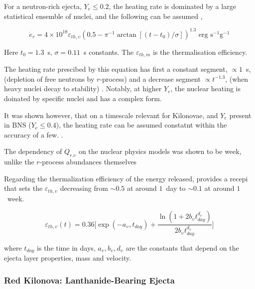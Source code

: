 \documentclass[11pt,a4paper,headinclude=true,DIV=14,BCOR=8mm,chapterprefix,listof=totoc,twoside,openright,abstracton]{scrbook}
\begin{document}
For a neutron-rich ejecta, $Y_e\leq0.2$, the heating rate is dominated by a large statistical ensemble of nuclei, and the following can be assumed \cite{Korobkin et al 2012},

\begin{equation}
    \dot{e}_r = 4\times 10^{18} \varepsilon_{th,\upsilon}(0.5 - \pi^{-1} \arctan[(t-t_0)/\sigma])^{1.3} \text{ erg } \text{s}^{-1} \text{g}^{-1}
\end{equation}

Here $t_0=1.3$~s, $\sigma=0.11$~s constants. The $\varepsilon_{th,m}$ is the thermalisation efficiency.

The heating rate prescibed by this equation has first a constant segment, $\propto1$~s, (depletion of free neutrons by $r$-process) and a decrease segment $\propto t^{-1.3}$, (when heavy nuclei decay to stability) \cite{(Metzger et al 2010b; Roberts et al 2011)}. 
Notably, at higher $Y_e$, the nuclear heating is doinated by specific nuclei and has a complex form.

It was shown however, that on a timescale relevant for Kilonovae, and $Y_e$ present in BNS ($Y_e\leq0.4$), the heating rate can be assumed constatnt within the accuracy of a few. \cite{(Lippuner and Roberts 2015, their Fig. 7)}.

The dependency of $\dot{Q}_{r.\upsilon}$ on the nuclear physics models was shown to be week, unlike the $r$-process abundances themselves \cite{Eichler et al 2015; Wu et al 2016; Mumpower et al 2016).}

Regarding the thermalization efficiency of the energy released, \cite{Barnes et al (2016)} provides a recepi that sets the $\varepsilon_{th,\upsilon}$ decreasing from $\sim0.5$ at around $1$~day to $\sim0.1$ at around $1$~week. 

\begin{equation}
    \varepsilon_{th,\upsilon}(t) = 0.36 \Bigg[ \exp(-a_{\upsilon}, t_{day}) + \frac{\ln(1+2b_{\upsilon} t_{day}^{d_{\upsilon}})}{2b_{\upsilon}t_{day}^{d_{\upsilon}}} \Bigg]
\end{equation}

where $t_{day}$ is the time in days, ${a_{\upsilon}, b_{\upsilon}, d_{\upsilon}}$ are the constants that depend on the ejecta layer properties, mass and velocity. 


\subsubsection{Red Kilonova: Lanthanide-Bearing Ejecta}
\end{document}
